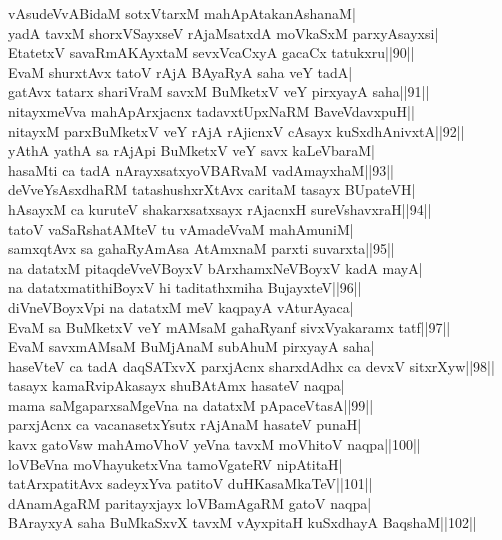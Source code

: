 \documentclass{article}
\begin{document}
vAsudeVvABidaM sotxVtarxM mahApAtakanAshanaM|\\
yadA tavxM shorxVSayxseV rAjaMsatxdA moVkaSxM parxyAsayxsi|\\
EtatetxV savaRmAKAyxtaM sevxVcaCxyA gacaCx tatukxru||90||\\
EvaM shurxtAvx tatoV rAjA BAyaRyA saha veY tadA|\\
gatAvx tatarx shariVraM savxM BuMketxV veY pirxyayA saha||91||\\
nitayxmeVva mahApArxjacnx tadavxtUpxNaRM BaveVdavxpuH||\\
nitayxM parxBuMketxV veY rAjA rAjicnxV cAsayx kuSxdhAnivxtA||92||\\
yAthA yathA sa rAjApi BuMketxV veY savx kaLeVbaraM|\\
hasaMti ca tadA nArayxsatxyoVBARvaM vadAmayxhaM||93||\\
deVveYsAsxdhaRM tatashushxrXtAvx caritaM tasayx BUpateVH|\\
hAsayxM ca kuruteV shakarxsatxsayx rAjacnxH sureVshavxraH||94||\\
tatoV vaSaRshatAMteV tu vAmadeVvaM mahAmuniM|\\
samxqtAvx sa gahaRyAmAsa AtAmxnaM parxti suvarxta||95||\\
na datatxM pitaqdeVveVBoyxV bArxhamxNeVBoyxV kadA mayA|\\
na datatxmatithiBoyxV hi taditathxmiha BujayxteV||96||\\
diVneVBoyxVpi na datatxM meV kaqpayA vAturAyaca|\\
EvaM sa BuMketxV veY mAMsaM gahaRyanf sivxVyakaramx tatf||97||\\
EvaM savxmAMsaM BuMjAnaM subAhuM pirxyayA saha|\\
haseVteV ca tadA daqSATxvX parxjAcnx sharxdAdhx ca devxV sitxrXyw||98||\\
tasayx kamaRvipAkasayx shuBAtAmx hasateV naqpa|\\
mama saMgaparxsaMgeVna na datatxM pApaceVtasA||99||\\
parxjAcnx ca vacanasetxYsutx rAjAnaM hasateV punaH|\\
kavx gatoVsw mahAmoVhoV yeVna tavxM moVhitoV naqpa||100||\\
loVBeVna moVhayuketxVna tamoVgateRV nipAtitaH|\\
tatArxpatitAvx sadeyxYva patitoV duHKasaMkaTeV||101||\\
dAnamAgaRM paritayxjayx loVBamAgaRM gatoV naqpa|\\
BArayxyA saha BuMkaSxvX tavxM vAyxpitaH kuSxdhayA BaqshaM||102||\\
\end{document}

